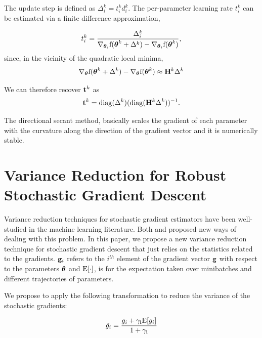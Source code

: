 \documentclass{article}
\begin{document}
The update step is defined as $\Delta_{i}^k = t_i^k d_i^k$. The per-parameter learning rate
$t_i^k$ can be estimated via a finite difference approximation,

\begin{equation}
t_i^k = \frac{\Delta_{i}^k}{\nabla_{{\boldsymbol{\theta}}_i} \text{f}({\boldsymbol{\theta}}^k + \Delta^k) - \nabla_{{\boldsymbol{\theta}}_i} \text{f}({\boldsymbol{\theta}}^k)},
\end{equation}
since, in the vicinity of the quadratic local minima,
\begin{align}
    \nabla_{{\boldsymbol{\theta}}} \text{f}({\boldsymbol{\theta}}^k + \Delta^k) - \nabla_{{\boldsymbol{\theta}}} \text{f}({\boldsymbol{\theta}}^k) \approx {\mathbf H}^{k} \Delta^k
\end{align}

We can therefore recover $\mathbf{t}^k$ as
\begin{equation}
\mathbf{t}^k = \operatorname{diag}(\Delta^k)(\operatorname{diag}({\mathbf H}^{k} \Delta^k))^{-1}.
\end{equation}

The directional secant method, basically scales the gradient of each parameter with the curvature along the direction of the gradient vector 
and it is numerically stable.


\section{Variance Reduction for Robust Stochastic Gradient Descent}
\label{sec:var_reduction}

Variance reduction techniques for stochastic gradient estimators have been well-studied 
in the machine learning literature. Both \cite{wang2013variance} and \cite{johnson2013accelerating} proposed new
ways of dealing with this problem. In this paper, we propose a new variance reduction technique 
for stochastic gradient descent that just relies on the statistics related to the gradients. $\mathbf{g}_i$
refers to the $i^{th}$ element of the gradient vector $\mathbf{g}$  with respect to the parameters 
${\boldsymbol{\theta}}$ and $\mathrm{E}[\cdot]$, is for the expectation taken over minibatches and different trajectories of
parameters.

We propose to apply the following transformation to reduce the variance of the stochastic
gradients:

\begin{equation}
\label{sec:var_reduc}
\tilde{g_i}=\frac{g_i + \mathbf{\gamma_i}\mathrm{E}[g_i]}{1+\mathbf{\gamma_i}}
\end{equation}
\end{document}
